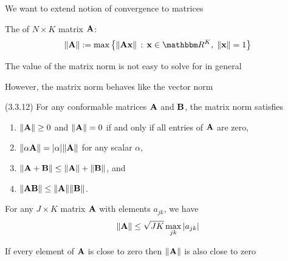 \begin{frame}

    \vspace{2em}
    We want to extend notion of convergence to matrices
    
    \vspace{.7em}
    The  of $N \times K$ matrix $\mathbf A$:
    \begin{equation}
    \label{eq:mn}
    \| \boldA \| :=
    \max \left\{ 
        \| \boldA \boldx \| \,: \, 
        \boldx \in \RR^K, \; \| \boldx \| = 1
        \right\}
    \end{equation}

    \vspace{.7em}
    The value of the matrix norm is not easy to solve for in
    general
    
    However, the matrix
    norm behaves like the vector norm
    
\end{frame}

\begin{frame}

    \vspace{2em}
    \Fact (3.3.12)
    For any conformable matrices $\mathbf A$ and $\mathbf B$, the matrix norm 
    satisfies
    \begin{enumerate}
        \item $\| \mathbf A \| \geq 0$ and $\| \mathbf A \| = 0$ if and only if all entries of
            $\mathbf A$ are zero,
        \item $\| \alpha \mathbf A \| = |\alpha| \| \mathbf A \|$ for any scalar
            $\alpha$,
        \item $\| \mathbf A + \mathbf B \| \leq \| \mathbf A \| + \| \mathbf B \|$, and
        \item $\| \mathbf A \mathbf B \| \leq \| \mathbf A \| \| \mathbf B \|$.
    \end{enumerate}
    
    
\end{frame}

\begin{frame}

    \vspace{2em}
    \Fact{\eqref{ET-fa:mnbd}}
    For any $J \times K$ matrix $\mathbf A$ with elements $a_{jk}$, we have
    \begin{equation*}
        \| \mathbf A \| \leq \sqrt{JK} \max_{jk} |a_{jk}|
    \end{equation*}
    
    \vspace{1em}
    If every element of
    $\mathbf A$ is close to zero then $\| \mathbf A \|$ is also close to zero

\end{frame}

